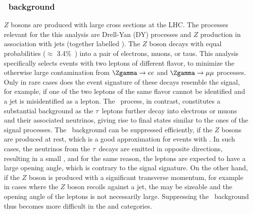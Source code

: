 \subsubsection{\Ztautau\ background}
$Z$ bosons are produced with large cross sections at the LHC. The processes relevant for the this analysis are Drell-Yan (DY) processes and $Z$ production in association with jets (together labelled \Zgamma).
The $Z$ boson decays with equal probabilities ($\approx$ 3.4\%~\cite{PDG2020}) into a pair of electrons, muons, or taus. 
This analysis specifically selects events with two leptons of different flavor, to minimize the otherwise large contamination from $\Zgamma \to ee$ and $\Zgamma \to \mu\mu$ processes. 
Only in rare cases does the event signature of these decays resemble the signal, for example, if one of the two leptons of the same flavor cannot be identified and a jet is misidentified as a lepton.
The \Ztautau\ process, in contrast, constitutes a substantial background as the $\tau$~leptons further decay into electrons or muons and their associated neutrinos, giving rise to final states similar to the ones of the signal processes. 
The \Ztautau\ background can be suppressed efficiently, if the $Z$ bosons are produced at rest, which is a good approximation for events with \ZeroJet. In such cases, the neutrinos from the $\tau$~decays are emitted in opposite directions, resulting in a small \MET, and for the same reason, the leptons are expected to have a large opening angle, which is contrary to the signal signature. 
On the other hand, if the $Z$ boson is produced with a significant transverse momentum, for example in cases where the $Z$ boson recoils against a jet, the \MET may be sizeable and the opening angle of the leptons is not necessarily large. 
Suppressing the \Ztautau\ background thus becomes more difficult in the \OneJet and \TwoJet categories. 

